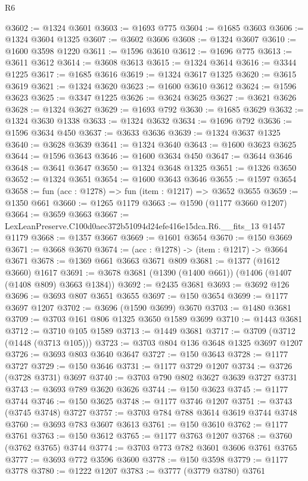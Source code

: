\begin{lexlean}{R6}
\begin{coremodule}
@3602 := @1324 @3601
@3603 := @1693 @775
@3604 := @1685 @3603
@3606 := @1324 @3604 @1325
@3607 := @3602 @3606
@3608 := @1324 @3607
@3610 := @1600 @3598 @1220
@3611 := @1596 @3610
@3612 := @1696 @775
@3613 := @3611 @3612
@3614 := @3608 @3613
@3615 := @1324 @3614
@3616 := @3344 @1225
@3617 := @1685 @3616
@3619 := @1324 @3617 @1325
@3620 := @3615 @3619
@3621 := @1324 @3620
@3623 := @1600 @3610 @3612
@3624 := @1596 @3623
@3625 := @3347 @1225
@3626 := @3624 @3625
@3627 := @3621 @3626
@3628 := @1324 @3627
@3629 := @1693 @792
@3630 := @1685 @3629
@3632 := @1324 @3630 @1338
@3633 := @1324 @3632
@3634 := @1696 @792
@3636 := @1596 @3634 @450
@3637 := @3633 @3636
@3639 := @1324 @3637 @1325
@3640 := @3628 @3639
@3641 := @1324 @3640
@3643 := @1600 @3623 @3625
@3644 := @1596 @3643
@3646 := @1600 @3634 @450
@3647 := @3644 @3646
@3648 := @3641 @3647
@3650 := @1324 @3648 @1325
@3651 := @1326 @3650
@3652 := @1324 @3651
@3654 := @1600 @3643 @3646
@3655 := @1597 @3654
@3658 := fun (acc : @1278) => fun (item : @1217) => @3652 @3655
@3659 := @1350 @661
@3660 := @1265 @1179
@3663 := @1590 (@1177 @3660 @1207)
@3664 := @3659 @3663
@3667 := LexLeanPreserve.C100d0aec372b51094d24efe416e15dca.R6.__fits_13 @1457 @1179
@3668 := @1357 @3667
@3669 := @1601 @3654
@3670 := @150 @3669
@3671 := @3668 @3670
@3674 := (acc : @1278) -> (item : @1217) -> @3664 @3671
@3678 := @1369 @661 @3663 @3671 @809
@3681 := @1377 (@1612 @3660) @1617
@3691 := @3678 @3681 (@1390 (@1400 @661)) (@1406 (@1407 (@1408 @809) @3663 @1384))
@3692 := @2435 @3681
@3693 := @3692 @126
@3696 := @3693 @807 @3651 @3655
@3697 := @150 @3654
@3699 := @1177 @3697 @1207
@3702 := @3696 (@1590 @3699) @3670
@3703 := @1480 @3681
@3709 := @3703 @161 @806 @1325 @3650 @1589 @3699
@3710 := @1443 @3681
@3712 := @3710 @105 @1589
@3713 := @1449 @3681
@3717 := @3709 (@3712 (@1448 (@3713 @105)))
@3723 := @3703 @804 @136 @3648 @1325 @3697 @1207
@3726 := @3693 @803 @3640 @3647
@3727 := @150 @3643
@3728 := @1177 @3727
@3729 := @150 @3646
@3731 := @1177 @3729 @1207
@3734 := @3726 (@3728 @3731) @3697
@3740 := @3703 @790 @802 @3627 @3639 @3727 @3731
@3743 := @3693 @789 @3620 @3626
@3744 := @150 @3623
@3745 := @1177 @3744
@3746 := @150 @3625
@3748 := @1177 @3746 @1207
@3751 := @3743 (@3745 @3748) @3727
@3757 := @3703 @784 @788 @3614 @3619 @3744 @3748
@3760 := @3693 @783 @3607 @3613
@3761 := @150 @3610
@3762 := @1177 @3761
@3763 := @150 @3612
@3765 := @1177 @3763 @1207
@3768 := @3760 (@3762 @3765) @3744
@3774 := @3703 @773 @782 @3601 @3606 @3761 @3765
@3777 := @3693 @772 @3596 @3600
@3778 := @150 @3598
@3779 := @1177 @3778
@3780 := @1222 @1207
@3783 := @3777 (@3779 @3780) @3761

\end{coremodule}
\end{lexlean}
